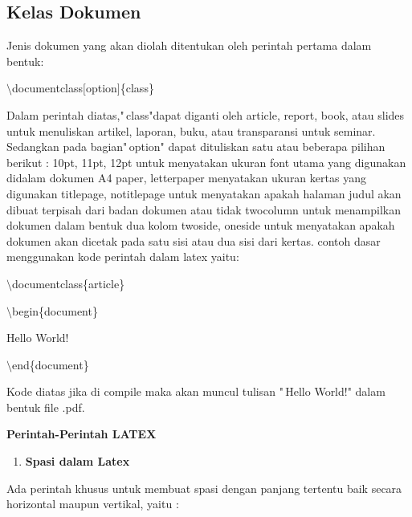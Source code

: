 \subsection {Kelas Dokumen}\par
\vspace{12pt}
Jenis dokumen yang akan diolah ditentukan oleh perintah pertama dalam bentuk: \par \vspace{12pt} $\setminus$documentclass$[$option$]$\{class\}\par \vspace{12pt}

Dalam perintah diatas,"\,class"dapat diganti oleh article, report, book, atau slides untuk menuliskan artikel, laporan, buku, atau transparansi untuk seminar. Sedangkan pada bagian"\,option" dapat dituliskan satu 
atau beberapa pilihan berikut : 10pt, 11pt, 12pt untuk menyatakan ukuran font utama yang digunakan didalam dokumen A4 paper, letterpaper menyatakan ukuran kertas yang digunakan titlepage, notitlepage untuk menyatakan apakah halaman judul akan dibuat terpisah dari badan dokumen atau tidak twocolumn untuk menampilkan dokumen dalam bentuk dua kolom twoside, oneside untuk menyatakan apakah dokumen akan dicetak pada satu 
sisi atau dua sisi dari kertas. contoh dasar menggunakan kode perintah dalam latex yaitu:\par \vspace{12pt}

$\setminus$documentclass\{article\}\par \vspace{12pt}

$\setminus$begin\{document\}\par \vspace{12pt}

Hello World!\par \vspace{12pt}

$\setminus$end\{document\}\par \vspace{12pt}

Kode diatas jika di compile maka akan muncul tulisan "\,Hello World!" 
dalam bentuk file .pdf.\par \vspace{12pt}

\textbf{Perintah-Perintah LATEX}

\begin{enumerate}
\item \textbf{Spasi dalam Latex}
\setcounter{numberedCntB}{\theenumi}
\end{enumerate}
Ada perintah khusus untuk membuat spasi dengan panjang tertentu baik secara horizontal maupun vertikal, yaitu :

